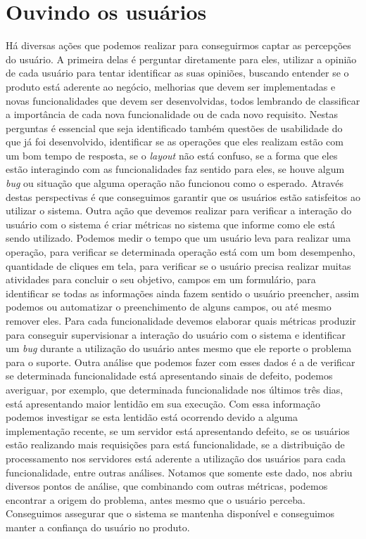     \section{Ouvindo os usuários}
      Há diversas ações que podemos realizar para conseguirmos captar as percepções
      do usuário. A primeira delas é perguntar diretamente para eles, utilizar
      a opinião de cada usuário para tentar identificar as suas opiniões, buscando
      entender se o produto está aderente ao negócio, melhorias que devem ser
      implementadas e novas funcionalidades que devem ser desenvolvidas, todos
      lembrando de classificar a importância de cada nova funcionalidade ou de
      cada novo requisito. Nestas perguntas é essencial que seja identificado também
      questões de usabilidade do que já foi desenvolvido, identificar se as
      operações que eles realizam estão com um bom tempo de resposta, se o
      \textit{layout} não está confuso, se a forma que eles estão interagindo com
      as funcionalidades faz sentido para eles, se houve algum \textit{bug} ou
      situação que alguma operação não funcionou como o esperado. Através destas
      perspectivas é que conseguimos garantir que os usuários estão satisfeitos
      ao utilizar o sistema. \newline
      Outra ação que devemos realizar para verificar a interação do usuário com o
      sistema é criar métricas no sistema que informe como ele está sendo utilizado.
      Podemos medir o tempo que um usuário leva para realizar uma operação, para
      verificar se determinada operação está com um bom desempenho, quantidade de
      cliques em tela, para verificar se o usuário precisa realizar muitas atividades
      para concluir o seu objetivo, campos em um formulário, para identificar se
      todas as informações ainda fazem sentido o usuário preencher, assim podemos
      ou automatizar o preenchimento de alguns campos, ou até mesmo remover eles.
      Para cada funcionalidade devemos elaborar quais métricas produzir para
      conseguir supervisionar a interação do usuário com o sistema e identificar
      um \textit{bug} durante a utilização do usuário antes mesmo que ele reporte
      o problema para o suporte. Outra análise que podemos fazer com esses dados é
      a de verificar se determinada funcionalidade está apresentando sinais de
      defeito, podemos averiguar, por exemplo, que determinada funcionalidade nos
      últimos três dias, está apresentando maior lentidão em sua execução. Com
      essa informação podemos investigar se esta lentidão está ocorrendo devido
      a alguma implementação recente, se um servidor está apresentando defeito,
      se os usuários estão realizando mais requisições para está funcionalidade,
      se a distribuição de processamento nos servidores está aderente a utilização
      dos usuários para cada funcionalidade, entre outras análises. Notamos que
      somente este dado, nos abriu diversos pontos de análise, que combinando com
      outras métricas, podemos encontrar a origem do problema, antes mesmo que o
      usuário perceba. Conseguimos assegurar que o sistema se mantenha disponível
      e conseguimos manter a confiança do usuário no produto.

